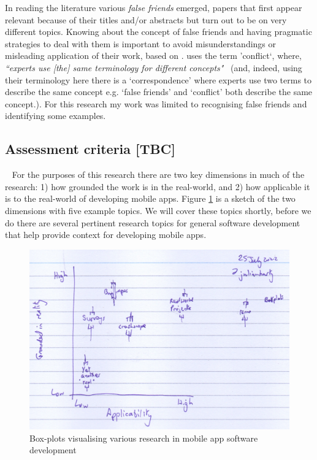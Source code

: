 In reading the literature various \textit{false friends} emerged, papers that first appear relevant because of their titles and/or abstracts but turn out to be on very different topics. 
Knowing about the concept of false friends and having pragmatic strategies to deal with them is important to avoid misunderstandings or misleading application of their work, 
based on \cite[p. 1833]{chamizodominguez2002_false_friends_their_origins_and_semantics_in_some_languages}. 
\textcite{shaw1989_comparing_conceptual_structures__consensus_conflict_correspondence_and_contrast} uses the term 'conflict`, where, \emph{``experts use [the] same terminology for different concepts"}~\cite[p. 3]{shaw1989_comparing_conceptual_structures__consensus_conflict_correspondence_and_contrast} (and, indeed, using their terminology here there is a `correspondence' where experts use two terms to describe the same concept e.g. `false friends' and `conflict' both describe the same concept.). For this research my work was limited to recognising false friends and identifying some examples. 

\subsection{Assessment criteria [TBC]}~\label{rw-assessment-criteria-topic}
For the purposes of this research there are two key dimensions in much of the research: 1) how grounded the work is in the real-world, and 2) how applicable it is to the real-world of developing mobile apps. Figure \ref{fig:grounded-and-applicable-boxplots} is a sketch of the two dimensions with five example topics. We will cover these topics shortly, %
before we do there are several pertinent research topics for general software development that help provide context for developing mobile apps.

\begin{figure}
    \centering
    \includegraphics[width=\linewidth]{images/rough-sketches/grounded-and-applicable.jpeg}
    \caption{Box-plots visualising various research in mobile app software development}
    \label{fig:grounded-and-applicable-boxplots}
\end{figure}


